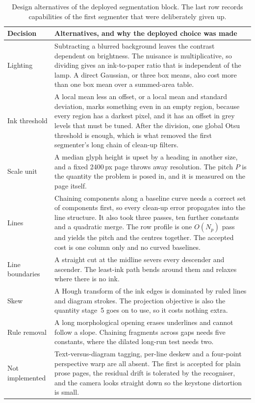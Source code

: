 \begin{table}[h]
\centering
\fontsize{8.5}{10.2}\selectfont
\setlength{\tabcolsep}{4pt}
\begin{tabularx}{\linewidth}{|p{2.4cm}|X|}
\hline
\textbf{Decision} & \textbf{Alternatives, and why the deployed choice was made} \\
\hline
Lighting & Subtracting a blurred background leaves the contrast dependent on brightness. The nuisance is multiplicative, so dividing gives an ink-to-paper ratio that is independent of the lamp. A direct Gaussian, or three box means, also cost more than one box mean over a summed-area table. \\
\hline
Ink threshold & A local mean less an offset, or a local mean and standard deviation, marks something even in an empty region, because every region has a darkest pixel, and it has an offset in grey levels that must be tuned. After the division, one global Otsu threshold is enough, which is what removed the first segmenter's long chain of clean-up filters. \\
\hline
Scale unit & A median glyph height is upset by a heading in another size, and a fixed 2400\,px page throws away resolution. The pitch $P$ is the quantity the problem is posed in, and it is measured on the page itself. \\
\hline
Lines & Chaining components along a baseline curve needs a correct set of components first, so every clean-up error propagates into the line structure. It also took three passes, ten further constants and a quadratic merge. The row profile is one $O(N_p)$ pass and yields the pitch and the centres together. The accepted cost is one column only and no curved baselines. \\
\hline
Line boundaries & A straight cut at the midline severs every descender and ascender. The least-ink path bends around them and relaxes where there is no ink. \\
\hline
Skew & A Hough transform of the ink edges is dominated by ruled lines and diagram strokes. The projection objective is also the quantity stage~5 goes on to use, so it costs nothing extra. \\
\hline
Rule removal & A long morphological opening erases underlines and cannot follow a slope. Chaining fragments across gaps needs five constants, where the dilated long-run test needs two. \\
\hline
Not implemented & Text-versus-diagram tagging, per-line deskew and a four-point perspective warp are all absent. The first is accepted for plain prose pages, the residual drift is tolerated by the recogniser, and the camera looks straight down so the keystone distortion is small. \\
\hline
\end{tabularx}
\caption{Design alternatives of the deployed segmentation block. The last row records capabilities of the first segmenter that were deliberately given up.}
\label{tab:seg-alt}
\end{table}
